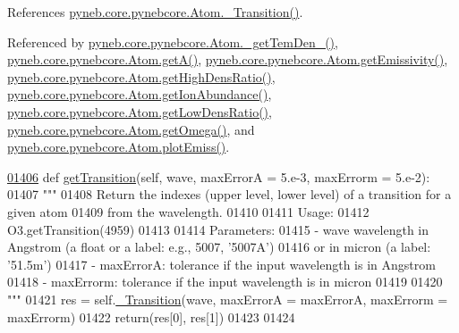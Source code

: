 References \hyperlink{pynebcore_8py_source_l01367}{pyneb.\+core.\+pynebcore.\+Atom.\+\_\+\+Transition()}.



Referenced by \hyperlink{pynebcore_8py_source_l01803}{pyneb.\+core.\+pynebcore.\+Atom.\+\_\+get\+Tem\+Den\+\_()}, \hyperlink{pynebcore_8py_source_l01471}{pyneb.\+core.\+pynebcore.\+Atom.\+get\+A()}, \hyperlink{pynebcore_8py_source_l01716}{pyneb.\+core.\+pynebcore.\+Atom.\+get\+Emissivity()}, \hyperlink{pynebcore_8py_source_l01653}{pyneb.\+core.\+pynebcore.\+Atom.\+get\+High\+Dens\+Ratio()}, \hyperlink{pynebcore_8py_source_l02110}{pyneb.\+core.\+pynebcore.\+Atom.\+get\+Ion\+Abundance()}, \hyperlink{pynebcore_8py_source_l01632}{pyneb.\+core.\+pynebcore.\+Atom.\+get\+Low\+Dens\+Ratio()}, \hyperlink{pynebcore_8py_source_l01262}{pyneb.\+core.\+pynebcore.\+Atom.\+get\+Omega()}, and \hyperlink{pynebcore_8py_source_l02313}{pyneb.\+core.\+pynebcore.\+Atom.\+plot\+Emiss()}.


\begin{DoxyCode}
\hypertarget{classpyneb_1_1core_1_1pynebcore_1_1_atom_l01406}{}\hyperlink{classpyneb_1_1core_1_1pynebcore_1_1_atom_a7c9f17a3d9e841267add92377d9d1ede}{01406}     \textcolor{keyword}{def }\hyperlink{classpyneb_1_1core_1_1pynebcore_1_1_atom_a7c9f17a3d9e841267add92377d9d1ede}{getTransition}(self, wave, maxErrorA = 5.e-3, maxErrorm = 5.e-2):
01407         \textcolor{stringliteral}{"""}
01408 \textcolor{stringliteral}{        Return the indexes (upper level, lower level) of a transition for a given atom }
01409 \textcolor{stringliteral}{            from the wavelength.}
01410 \textcolor{stringliteral}{        }
01411 \textcolor{stringliteral}{        Usage:}
01412 \textcolor{stringliteral}{            O3.getTransition(4959)}
01413 \textcolor{stringliteral}{            }
01414 \textcolor{stringliteral}{        Parameters:}
01415 \textcolor{stringliteral}{            - wave      wavelength in Angstrom (a float or a label: e.g., 5007, '5007A') }
01416 \textcolor{stringliteral}{                or in micron (a label: '51.5m')}
01417 \textcolor{stringliteral}{            - maxErrorA: tolerance if the input wavelength is in Angstrom}
01418 \textcolor{stringliteral}{            - maxErrorm: tolerance if the input wavelength is in micron}
01419 \textcolor{stringliteral}{                }
01420 \textcolor{stringliteral}{        """} 
01421         res = self.\hyperlink{classpyneb_1_1core_1_1pynebcore_1_1_atom_a69f29cc10c77910841f9e3ff8ddef250}{\_Transition}(wave, maxErrorA = maxErrorA, maxErrorm = maxErrorm)
01422         return(res[0], res[1])
01423         
01424 
\end{DoxyCode}
\hypertarget{classpyneb_1_1core_1_1pynebcore_1_1_atom_adc2de658da17347204f430aff728650b}{}
